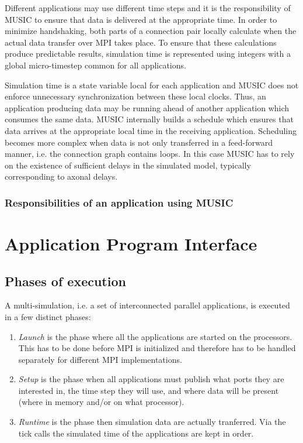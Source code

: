 \documentclass[a4paper]{report}
\begin{document}
Different applications may use different time steps and it is the
responsibility of MUSIC to ensure that data is delivered at the
appropriate time.  In order to minimize handshaking, both parts of a
connection pair locally calculate when the actual data transfer over
MPI takes place.  To ensure that these calculations produce
predictable results, simulation time is represented using integers
with a global micro-timestep common for all applications.

Simulation time is a state variable local for each application and
MUSIC does not enforce unnecessary synchronization between these local
clocks.  Thus, an application producing data may be running ahead of
another application which consumes the same data.  MUSIC internally
builds a schedule which ensures that data arrives at the appropriate
local time in the receiving application.  Scheduling becomes more
complex when data is not only transferred in a feed-forward manner,
i.e. the connection graph contains loops.  In this case MUSIC has to
rely on the existence of sufficient delays in the simulated model,
typically corresponding to axonal delays.


\subsection{Responsibilities of an application using MUSIC}

\chapter{Application Program Interface}

\section{Phases of execution}

A multi-simulation, i.e. a set of interconnected parallel
applications, is executed in a few distinct phases:
\begin{enumerate}
\item \emph{Launch} is the phase where all the applications are
  started on the processors.  This has to be done before MPI is
  initialized and therefore has to be handled separately for different
  MPI implementations.
\item \emph{Setup} is the phase when all applications must publish
  what ports they are interested in, the time step they will use, and
  where data will be present (where in memory and/or on what processor).
\item \emph{Runtime} is the phase then simulation data are actually
  tranferred.  Via the tick calls the simulated time of the
  applications are kept in order.
\end{enumerate}
\end{document}
